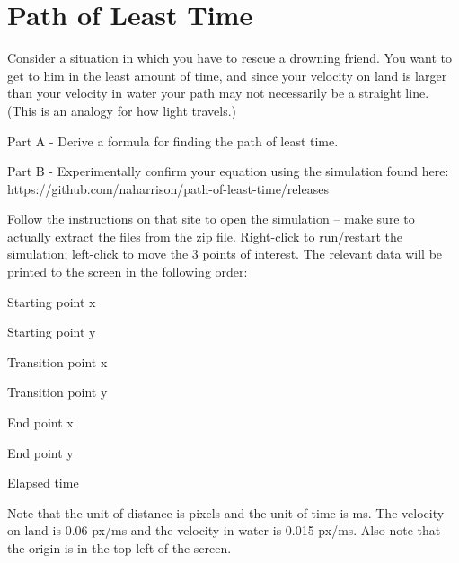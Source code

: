 \section{Path of Least Time}

Consider a situation in which you have to rescue a drowning friend.
You want to get to him in the least amount of time, and since your velocity on land is larger than your velocity in water your path may not necessarily be a straight line. 
(This is an analogy for how light travels.)

\vspace{\baselineskip}

Part A - Derive a formula for finding the path of least time.

\vspace{\baselineskip}

Part B - Experimentally confirm your equation using the simulation found here: https://github.com/naharrison/path-of-least-time/releases

\vspace{\baselineskip}

Follow the instructions on that site to open the simulation – make sure to actually extract the files from the zip file.
Right-click to run/restart the simulation; left-click to move the 3 points of interest.
The relevant data will be printed to the screen in the following order:

\vspace{\baselineskip}

Starting point x

Starting point y

Transition point x

Transition point y

End point x

End point y

Elapsed time

\vspace{\baselineskip}

Note that the unit of distance is pixels and the unit of time is ms.
The velocity on land is 0.06 px/ms and the velocity in water is 0.015 px/ms. Also note that the origin is in the top left of the screen.


\pagebreak \clearpage
